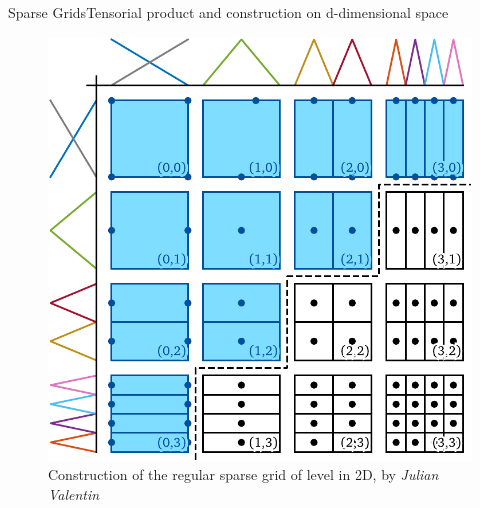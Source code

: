 \begin{frame}{Sparse Grids}{Tensorial product and construction on d-dimensional space}
    \begin{figure}
        \centering
        \includegraphics[width=\textwidth,height=0.6\textheight,keepaspectratio]{figures/sg_construction.pdf}
        \caption{Construction of the regular sparse grid of level in 2D, by \emph{Julian Valentin}}
    \end{figure}
\end{frame}
